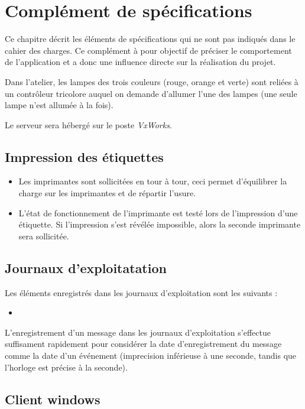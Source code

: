 \chapter{Complément de spécifications}

Ce chapitre décrit les éléments de spécifications qui ne sont pas indiqués dans
le cahier des charges. Ce complément à pour objectif de préciser le
comportement de l'application et a donc une influence directe sur la
réalisation du projet.

Dans l'atelier, les lampes des trois couleurs (rouge, orange et verte) sont
reliées à un contrôleur tricolore auquel on demande d'allumer l'une des lampes
(une seule lampe n'est allumée à la fois).

Le serveur sera hébergé sur le poste \textit{VxWorks}.

\section{Impression des étiquettes}

\begin{itemize}
	\item Les imprimantes sont sollicitées en tour à tour, ceci permet
d'équilibrer la charge sur les imprimantes et de répartir l'usure.
	\item L'état de fonctionnement de l'imprimante est testé lors de
l'impression d'une étiquette. Si l'impression s'est révélée impossible, alors
la seconde imprimante sera sollicitée.
\end{itemize}

\section{Journaux d'exploitatation}

Les éléments enregistrés dans les journaux d'exploitation sont les suivants :

\begin{itemize}
	\item 
\end{itemize}

L'enregistrement d'un message dans les journaux d'exploitation s'effectue
suffisament rapidement pour considérer la date d'enregistrement du message
comme la date d'un événement (imprecision inférieuse à une seconde, tandis que
l'horloge est précise à la seconde).

\section{Client windows}

